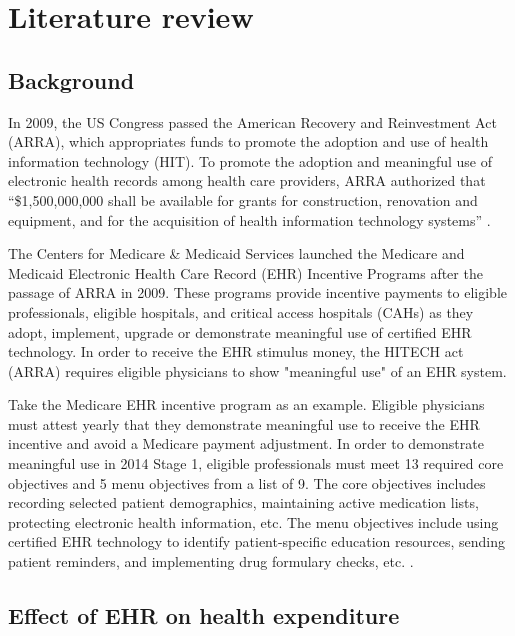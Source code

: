 \documentclass[12pt]{report}
\begin{document}
\chapter{Literature review}

\section{Background}

In 2009, the US Congress passed the American Recovery and Reinvestment Act (ARRA), which appropriates funds to promote the adoption and use of health information technology (HIT). To promote the adoption and meaningful use of electronic health records among health care providers, ARRA authorized that ``\$1,500,000,000 shall be available for grants for construction, renovation and equipment, and for the acquisition of health information technology systems'' \citep{AARALaw}.

The Centers for Medicare \& Medicaid Services launched the Medicare and Medicaid Electronic Health Care Record (EHR) Incentive Programs after the passage of ARRA in 2009. These programs provide incentive payments to eligible professionals, eligible hospitals, and critical access hospitals (CAHs) as they adopt, implement, upgrade or demonstrate meaningful use of certified EHR technology. In order to receive the EHR stimulus money, the HITECH act (ARRA) requires eligible physicians to show "meaningful use" of an EHR system.

Take the Medicare EHR incentive program as an example. Eligible physicians must attest yearly that they demonstrate meaningful use to receive the EHR incentive and avoid a Medicare payment adjustment. In order to demonstrate meaningful use in 2014 Stage 1, eligible professionals must meet 13 required core objectives and 5 menu objectives from a list of 9. The core objectives includes recording selected patient demographics, maintaining active medication lists, protecting electronic health information, etc. The menu objectives include using certified EHR technology to identify patient-specific education resources, sending patient reminders, and implementing drug formulary checks, etc. \citep{stage1}.

\section{Effect of EHR on health expenditure}
\end{document}
